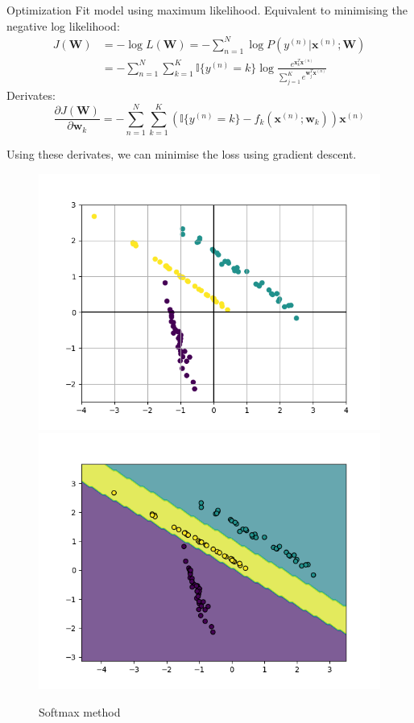 \documentclass[a4paper, 11pt]{article}
\begin{document}
{\large Optimization}
Fit model using maximum likelihood. Equivalent to minimising the negative log likelihood:
\begin{align*}
        J(\mathbf{W}) &= -\log{L(\mathbf{W})} = -\sum\limits_{n = 1}^{N}\log{P(y^{(n)}|\mathbf{x}^{(n)};\mathbf{W})}\\
        &= -\sum\limits_{n = 1}^{N}\sum\limits_{k = 1}^{K}\mathbb{I}\{y^{(n)}=k\}\log{\frac{e^{\mathbf{x}_{k}^{T}\mathbf{x}^{(n)}}}{\sum\limits_{j = 1}^{K}e^{\mathbf{w}_j^{T}\mathbf{x}^{(n)}}}}
\end{align*}
Derivates:
\begin{equation*}
        \frac{\partial J(\mathbf{W})}{\partial\mathbf{w}_k} = -\sum\limits_{n = 1}^{N}\sum\limits_{k = 1}^{K}\left(\mathbb{I}\{y^{(n)}=k\} - f_k(\mathbf{x}^{(n)};\mathbf{w}_k)\right)\mathbf{x}^{(n)}
\end{equation*}

Using these derivates, we can minimise the loss using gradient descent.

\begin{figure}[H]
        \centering
        \includegraphics[scale=0.5]{test.png}
        \includegraphics[scale=0.5]{softmax.png}

        \caption{Softmax method}
\end{figure}
\end{document}
